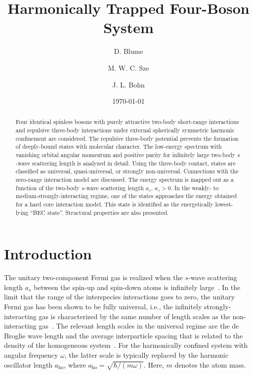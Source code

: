 \documentclass[aps,pra,twocolumn,showpacs,superscriptaddress]{revtex4}
\begin{document}
\title{Harmonically Trapped Four-Boson System}
\author{D. Blume}
\author{M. W. C. Sze}
\author{J. L. Bohn}
\date{\today}

\begin{abstract}
Four identical spinless bosons with purely attractive
two-body short-range interactions and repulsive three-body
interactions 
under external spherically symmetric harmonic confinement
are considered.
The repulsive three-body potential prevents 
the formation of deeply-bound states with molecular character.
The low-energy spectrum with
vanishing orbital
angular momentum and positive parity for infinitely large two-body
$s$-wave scattering length is analyzed in detail.
Using the three-body contact,
states are classified as universal, quasi-universal,
or strongly non-universal.
Connections with the zero-range interaction model
are discussed.
The energy spectrum is mapped out as
a function of the two-body $s$-wave scattering length $a_s$, $a_s>0$.
In the weakly- to medium-strongly-interacting regime, one of the states
approaches the energy obtained for a hard core interaction model.
This state is identified as the energetically lowest-lying ``BEC state''.
Structural properties are also presented.
\end{abstract}
\pacs{}
\maketitle


\section{Introduction}
\label{introduction}
The unitary two-component Fermi gas is realized when the 
$s$-wave scattering length $a_s$ between the spin-up
and spin-down atoms is infinitely
large~\cite{giorginiRMP}.
In the limit that the range of the interspecies interactions goes
to zero, the unitary Fermi gas has been shown to be fully universal,
i.e., the infinitely strongly-interacting gas is
characterized by the same number of length
scales as the non-interacting
gas~\cite{baker1999,cowell2002,werner2006PRA}.
The relevant length
scales in the universal
regime are the de Broglie wave length and the average interparticle
spacing that is related to the density of the 
homogeneous system~\cite{ho2004}. For the harmonically
confined system with angular frequency $\omega$,
the latter scale is typically replaced by the harmonic oscillator length
$a_{\text{ho}}$, where $a_{\text{ho}}=\sqrt{\hbar/(m \omega)}$. Here,
$m$ denotes the atom mass.
\end{document}
